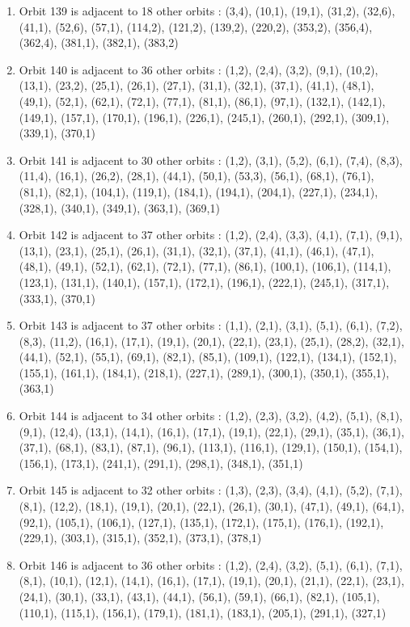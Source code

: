 \documentclass[12pt]{article}
\begin{document}
\begin{enumerate}
\item Orbit 139 is adjacent to 18 other orbits : (3,4), (10,1), (19,1), (31,2), (32,6), (41,1), (52,6), (57,1), (114,2), (121,2), (139,2), (220,2), (353,2), (356,4), (362,4), (381,1), (382,1), (383,2)
\item Orbit 140 is adjacent to 36 other orbits : (1,2), (2,4), (3,2), (9,1), (10,2), (13,1), (23,2), (25,1), (26,1), (27,1), (31,1), (32,1), (37,1), (41,1), (48,1), (49,1), (52,1), (62,1), (72,1), (77,1), (81,1), (86,1), (97,1), (132,1), (142,1), (149,1), (157,1), (170,1), (196,1), (226,1), (245,1), (260,1), (292,1), (309,1), (339,1), (370,1)
\item Orbit 141 is adjacent to 30 other orbits : (1,2), (3,1), (5,2), (6,1), (7,4), (8,3), (11,4), (16,1), (26,2), (28,1), (44,1), (50,1), (53,3), (56,1), (68,1), (76,1), (81,1), (82,1), (104,1), (119,1), (184,1), (194,1), (204,1), (227,1), (234,1), (328,1), (340,1), (349,1), (363,1), (369,1)
\item Orbit 142 is adjacent to 37 other orbits : (1,2), (2,4), (3,3), (4,1), (7,1), (9,1), (13,1), (23,1), (25,1), (26,1), (31,1), (32,1), (37,1), (41,1), (46,1), (47,1), (48,1), (49,1), (52,1), (62,1), (72,1), (77,1), (86,1), (100,1), (106,1), (114,1), (123,1), (131,1), (140,1), (157,1), (172,1), (196,1), (222,1), (245,1), (317,1), (333,1), (370,1)
\item Orbit 143 is adjacent to 37 other orbits : (1,1), (2,1), (3,1), (5,1), (6,1), (7,2), (8,3), (11,2), (16,1), (17,1), (19,1), (20,1), (22,1), (23,1), (25,1), (28,2), (32,1), (44,1), (52,1), (55,1), (69,1), (82,1), (85,1), (109,1), (122,1), (134,1), (152,1), (155,1), (161,1), (184,1), (218,1), (227,1), (289,1), (300,1), (350,1), (355,1), (363,1)
\item Orbit 144 is adjacent to 34 other orbits : (1,2), (2,3), (3,2), (4,2), (5,1), (8,1), (9,1), (12,4), (13,1), (14,1), (16,1), (17,1), (19,1), (22,1), (29,1), (35,1), (36,1), (37,1), (68,1), (83,1), (87,1), (96,1), (113,1), (116,1), (129,1), (150,1), (154,1), (156,1), (173,1), (241,1), (291,1), (298,1), (348,1), (351,1)
\item Orbit 145 is adjacent to 32 other orbits : (1,3), (2,3), (3,4), (4,1), (5,2), (7,1), (8,1), (12,2), (18,1), (19,1), (20,1), (22,1), (26,1), (30,1), (47,1), (49,1), (64,1), (92,1), (105,1), (106,1), (127,1), (135,1), (172,1), (175,1), (176,1), (192,1), (229,1), (303,1), (315,1), (352,1), (373,1), (378,1)
\item Orbit 146 is adjacent to 36 other orbits : (1,2), (2,4), (3,2), (5,1), (6,1), (7,1), (8,1), (10,1), (12,1), (14,1), (16,1), (17,1), (19,1), (20,1), (21,1), (22,1), (23,1), (24,1), (30,1), (33,1), (43,1), (44,1), (56,1), (59,1), (66,1), (82,1), (105,1), (110,1), (115,1), (156,1), (179,1), (181,1), (183,1), (205,1), (291,1), (327,1)

\end{enumerate}
\end{document}
